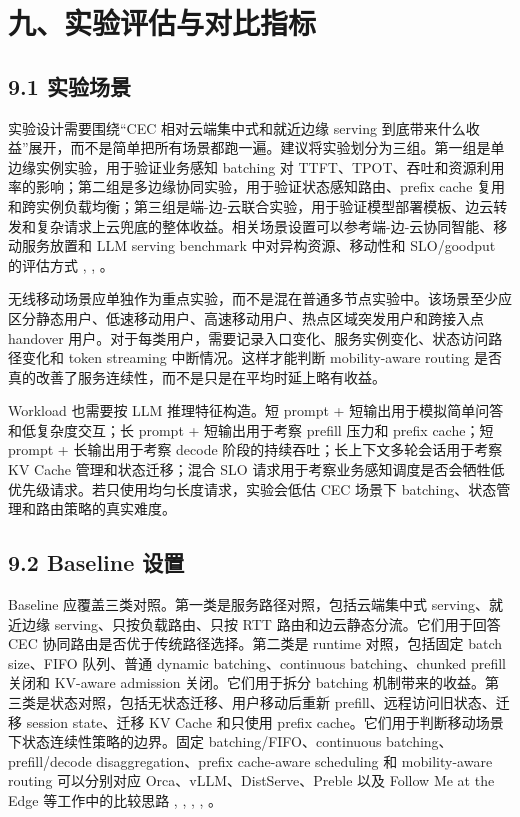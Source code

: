 \section*{九、实验评估与对比指标}

\subsection*{9.1 实验场景}

实验设计需要围绕“CEC 相对云端集中式和就近边缘 serving 到底带来什么收益”展开，而不是简单把所有场景都跑一遍。建议将实验划分为三组。第一组是单边缘实例实验，用于验证业务感知 batching 对 TTFT、TPOT、吞吐和资源利用率的影响；第二组是多边缘协同实验，用于验证状态感知路由、prefix cache 复用和跨实例负载均衡；第三组是端-边-云联合实验，用于验证模型部署模板、边云转发和复杂请求上云兜底的整体收益。相关场景设置可以参考端-边-云协同智能、移动服务放置和 LLM serving benchmark 中对异构资源、移动性和 SLO/goodput 的评估方式 , , 。

无线移动场景应单独作为重点实验，而不是混在普通多节点实验中。该场景至少应区分静态用户、低速移动用户、高速移动用户、热点区域突发用户和跨接入点 handover 用户。对于每类用户，需要记录入口变化、服务实例变化、状态访问路径变化和 token streaming 中断情况。这样才能判断 mobility-aware routing 是否真的改善了服务连续性，而不是只是在平均时延上略有收益。

Workload 也需要按 LLM 推理特征构造。短 prompt + 短输出用于模拟简单问答和低复杂度交互；长 prompt + 短输出用于考察 prefill 压力和 prefix cache；短 prompt + 长输出用于考察 decode 阶段的持续吞吐；长上下文多轮会话用于考察 KV Cache 管理和状态迁移；混合 SLO 请求用于考察业务感知调度是否会牺牲低优先级请求。若只使用均匀长度请求，实验会低估 CEC 场景下 batching、状态管理和路由策略的真实难度。


\subsection*{9.2 Baseline 设置}

Baseline 应覆盖三类对照。第一类是服务路径对照，包括云端集中式 serving、就近边缘 serving、只按负载路由、只按 RTT 路由和边云静态分流。它们用于回答 CEC 协同路由是否优于传统路径选择。第二类是 runtime 对照，包括固定 batch size、FIFO 队列、普通 dynamic batching、continuous batching、chunked prefill 关闭和 KV-aware admission 关闭。它们用于拆分 batching 机制带来的收益。第三类是状态对照，包括无状态迁移、用户移动后重新 prefill、远程访问旧状态、迁移 session state、迁移 KV Cache 和只使用 prefix cache。它们用于判断移动场景下状态连续性策略的边界。固定 batching/FIFO、continuous batching、prefill/decode disaggregation、prefix cache-aware scheduling 和 mobility-aware routing 可以分别对应 Orca、vLLM、DistServe、Preble 以及 Follow Me at the Edge 等工作中的比较思路 , , , , 。

